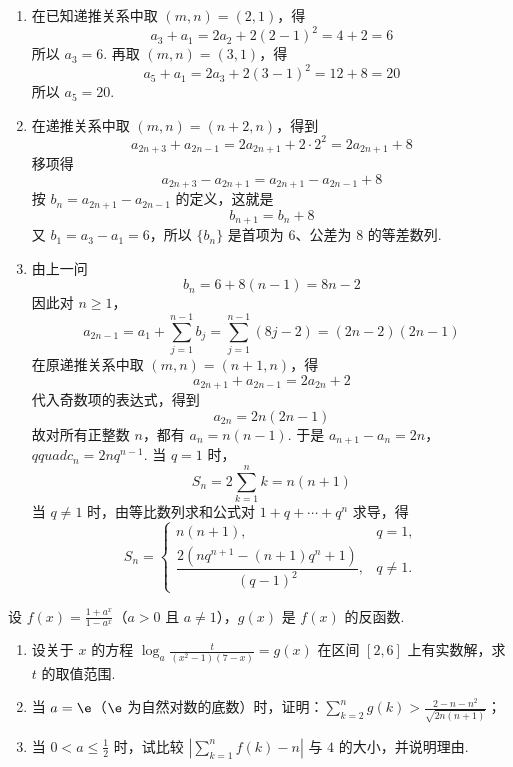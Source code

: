\begin{solution}
\begin{enumerate}
\item 在已知递推关系中取 \((m,n)=(2,1)\)，得
\[
a_3+a_1=2a_2+2(2-1)^2=4+2=6
\]
所以 \(a_3=6\). 再取 \((m,n)=(3,1)\)，得
\[
a_5+a_1=2a_3+2(3-1)^2=12+8=20
\]
所以 \(a_5=20\).

\item 在递推关系中取 \((m,n)=(n+2,n)\)，得到
\[
a_{2n+3}+a_{2n-1}=2a_{2n+1}+2\cdot2^2=2a_{2n+1}+8
\]
移项得
\[
a_{2n+3}-a_{2n+1}=a_{2n+1}-a_{2n-1}+8
\]
按 \(b_n=a_{2n+1}-a_{2n-1}\) 的定义，这就是
\[
b_{n+1}=b_n+8
\]
又 \(b_1=a_3-a_1=6\)，所以 \(\{b_n\}\) 是首项为 \(6\)、公差为 \(8\) 的等差数列.

\item 由上一问
\[
b_n=6+8(n-1)=8n-2
\]
因此对 \(n\geq1\)，
\[
a_{2n-1}=a_1+\sum_{j=1}^{n-1}b_j
=\sum_{j=1}^{n-1}(8j-2)
=(2n-2)(2n-1)
\]
在原递推关系中取 \((m,n)=(n+1,n)\)，得
\[
a_{2n+1}+a_{2n-1}=2a_{2n}+2
\]
代入奇数项的表达式，得到
\[
a_{2n}=2n(2n-1)
\]
故对所有正整数 \(n\)，都有 \(a_n=n(n-1)\). 于是
\(a_{n+1}-a_n=2n\)，\(qquad c_n=2nq^{n-1}\).
当 \(q=1\) 时，
\[
S_n=2\sum_{k=1}^{n}k=n(n+1)
\]
当 \(q\ne1\) 时，由等比数列求和公式对 \(1+q+\cdots+q^n\) 求导，得
\[
S_n=
\begin{cases}
n(n+1), & q=1,\\
\dfrac{2\left(nq^{n+1}-(n+1)q^n+1\right)}{\left(q-1\right)^2}, & q\ne 1.
\end{cases}
\]
\end{enumerate}
\end{solution}

\begin{problem}
设 \(f(x) = \frac{1 + a^x}{1 - a^x}\)（\(a > 0\) 且 \(a \ne 1\)），\(g(x)\) 是 \(f(x)\) 的反函数.
\begin{enumerate}
\item 设关于 \(x\) 的方程 \(\log_{a} \frac{t}{(x^2 - 1)(7 - x)} = g(x)\) 在区间 \([2,6]\) 上有实数解，求 \(t\) 的取值范围.
\item 当 \(a = \e\)（\(\e\) 为自然对数的底数）时，证明：\(\sum_{k=2}^{n} g(k) > \frac{2 - n - n^2}{\sqrt{2n(n+1)}}\)；
\item 当 \(0 < a \leqslant \frac{1}{2}\) 时，试比较 \(\left| \sum_{k=1}^{n} f(k) - n \right|\) 与 \(4\) 的大小，并说明理由.
\end{enumerate}
\end{problem}

